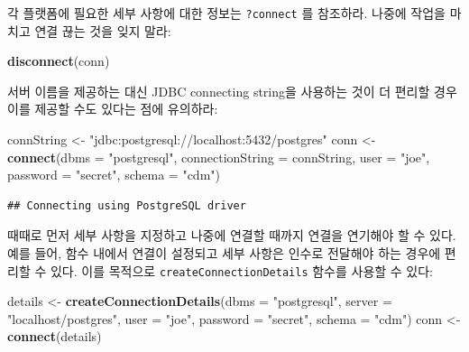 \documentclass[10.5pt]{book}
\newenvironment{Shaded}{\begin{snugshade}}{\end{snugshade}}
\newcommand{\KeywordTok}[1]{\textcolor[rgb]{0.13,0.29,0.53}{\textbf{#1}}}
\newcommand{\DataTypeTok}[1]{\textcolor[rgb]{0.13,0.29,0.53}{#1}}
\newcommand{\StringTok}[1]{\textcolor[rgb]{0.31,0.60,0.02}{#1}}
\newcommand{\NormalTok}[1]{#1}
\theoremstyle{definition}
\theoremstyle{definition}
\theoremstyle{definition}
\theoremstyle{remark}
\begin{document}
각 플랫폼에 필요한 세부 사항에 대한 정보는 \texttt{?connect} 를
참조하라. 나중에 작업을 마치고 연결 끊는 것을 잊지 말라:

\begin{Shaded}
\begin{Highlighting}[]
\KeywordTok{disconnect}\NormalTok{(conn)}
\end{Highlighting}
\end{Shaded}

서버 이름을 제공하는 대신 JDBC connecting string을 사용하는 것이 더
편리할 경우 이를 제공할 수도 있다는 점에 유의하라:

\begin{Shaded}
\begin{Highlighting}[]
\NormalTok{connString <-}\StringTok{ "jdbc:postgresql://localhost:5432/postgres"}
\NormalTok{conn <-}\StringTok{ }\KeywordTok{connect}\NormalTok{(}\DataTypeTok{dbms =} \StringTok{"postgresql"}\NormalTok{,}
                \DataTypeTok{connectionString =}\NormalTok{ connString,}
                \DataTypeTok{user =} \StringTok{"joe"}\NormalTok{,}
                \DataTypeTok{password =} \StringTok{"secret"}\NormalTok{,}
                \DataTypeTok{schema =} \StringTok{"cdm"}\NormalTok{)}
\end{Highlighting}
\end{Shaded}

\begin{verbatim}
## Connecting using PostgreSQL driver
\end{verbatim}

때때로 먼저 세부 사항을 지정하고 나중에 연결할 때까지 연결을 연기해야 할
수 있다. 예를 들어, 함수 내에서 연결이 설정되고 세부 사항은 인수로
전달해야 하는 경우에 편리할 수 있다. 이를 목적으로
\texttt{createConnectionDetails} 함수를 사용할 수 있다:

\begin{Shaded}
\begin{Highlighting}[]
\NormalTok{details <-}\StringTok{ }\KeywordTok{createConnectionDetails}\NormalTok{(}\DataTypeTok{dbms =} \StringTok{"postgresql"}\NormalTok{,}
                                   \DataTypeTok{server =} \StringTok{"localhost/postgres"}\NormalTok{,}
                                   \DataTypeTok{user =} \StringTok{"joe"}\NormalTok{,}
                                   \DataTypeTok{password =} \StringTok{"secret"}\NormalTok{,}
                                   \DataTypeTok{schema =} \StringTok{"cdm"}\NormalTok{)}
\NormalTok{conn <-}\StringTok{ }\KeywordTok{connect}\NormalTok{(details)}
\end{Highlighting}
\end{Shaded}
\end{document}
